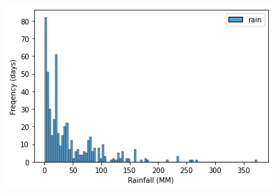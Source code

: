 \documentclass{beamer}
\begin{document}
\begin{frame}
\begin{columns}
            \includegraphics[width=0.8\linewidth]{HMM_Only/_freq_sim.png}
        \end{columns}
    \end{frame}
\end{document}

